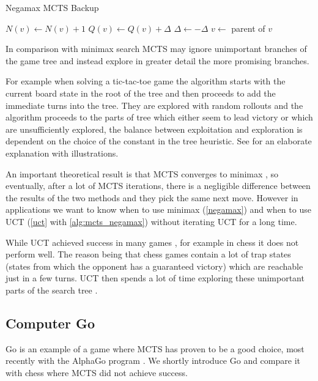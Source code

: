 \begin{algorithm}
\caption{Negamax MCTS Backup}
\label{alg:mcts_negamax}
\begin{algorithmic}
        \State $N(v) \gets N(v) + 1$
        \State $Q(v) \gets Q(v) + \Delta$
        \State $\Delta \gets - \Delta$
        \State $v \gets $ parent of $v$
    \EndWhile
\EndFunction
\end{algorithmic}
\end{algorithm}


In comparison with minimax search MCTS may ignore unimportant
branches of the game tree and instead explore in greater detail the more
promising branches.

For example when solving a tic-tac-toe game the algorithm starts with
the current board state in the root of the tree and then proceeds to
add the immediate turns into the tree. They are explored with random
rollouts and the algorithm proceeds to the parts of tree which
either seem to lead victory or which are unsufficiently explored, the
balance between exploitation and exploration is dependent on the choice of
the constant in the tree heuristic. See \parencite{mcts_ttt} for an
elaborate explanation with illustrations.

An important theoretical result is
that MCTS converges to minimax \parencite{Kocsis},
so eventually, after a lot of MCTS iterations, there is a negligible
difference between the results of the two methods and they pick the same
next move. However in
applications we want to know when to use minimax (\autoref{negamax}) and
when to use UCT (\autoref{uct} with \autoref{alg:mcts_negamax}) without
iterating UCT for a long time.

While UCT achieved success in many games \parencite{mcts_survey},
for example in chess it does not perform well. The reason being that chess
games contain a lot of trap states (states from which the opponent
has a guaranteed victory) which are reachable just in a few turns. UCT
then spends a lot of time exploring these unimportant parts of the search
tree \parencite{mcts_vs_chess}.

\subsection{Computer Go}

Go is an example of a game where MCTS has proven to be a good choice,
most recently with the AlphaGo program \parencite{alphago}.
We shortly introduce Go and compare it with chess where MCTS did not
achieve success.

